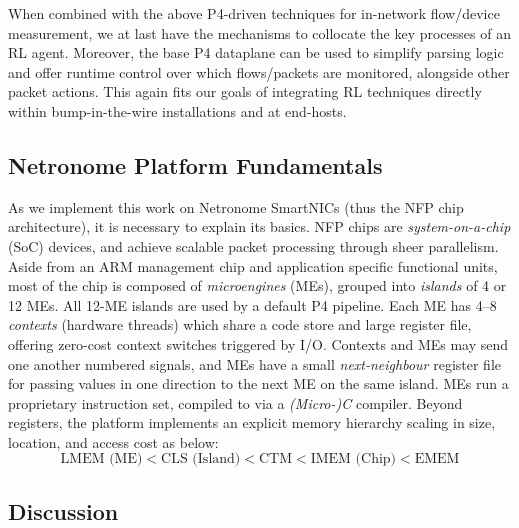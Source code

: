 \documentclass[sigconf,natbib=false]{acmart}
\newcounter{insightc}
\newenvironment{insight}
	{
		\begin{tipblock}\refstepcounter{insightc}\textbf{Insight \theinsightc:}\em
	}
	{
		\end{tipblock}
	}
\begin{document}
When combined with the above P4-driven techniques for in-network flow/device measurement, we at last have the mechanisms to collocate the key processes of an RL agent.
Moreover, the base P4 dataplane can be used to simplify parsing logic and offer runtime control over which flows/packets are monitored, alongside other packet actions.
This again fits our goals of integrating RL techniques directly within bump-in-the-wire installations and at end-hosts.


\subsection{Netronome Platform Fundamentals}
As we implement this work on Netronome SmartNICs (thus the NFP chip architecture), it is necessary to explain its basics.
NFP chips are \emph{system-on-a-chip} (SoC) devices, and achieve scalable packet processing through sheer parallelism.
Aside from an ARM management chip and application specific functional units, most of the chip is composed of \emph{microengines} (MEs), grouped into \emph{islands} of 4 or 12 MEs.
All 12-ME islands are used by a default P4 pipeline.
Each ME has \numrange{4}{8} \emph{contexts} (hardware threads) which share a code store and large register file, offering zero-cost context switches triggered by I/O.
Contexts and MEs may send one another numbered signals, and MEs have a small \emph{next-neighbour} register file for passing values in one direction to the next ME on the same island.
MEs run a proprietary instruction set, compiled to via a \emph{(Micro-)C} compiler.
Beyond registers, the platform implements an explicit memory hierarchy scaling in size, location, and access cost as below:
$$\text{LMEM (ME)} < \text{CLS (Island)} < \text{CTM} < \text{IMEM (Chip)} < \text{EMEM}$$

\subsection{Discussion}
\end{document}
